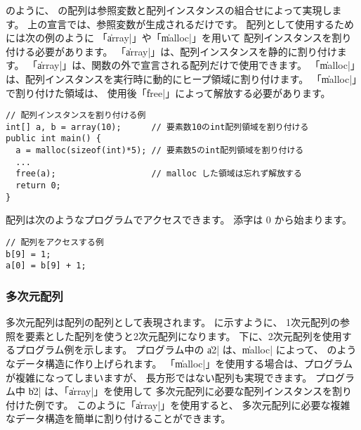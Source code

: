 のように、
\cmml の配列は参照変数と配列インスタンスの組合せによって実現します。
上の宣言では、参照変数が生成されるだけです。
配列として使用するためには次の例のように
「\|array|」や「\|malloc|」を用いて
配列インスタンスを割り付ける必要があります。
「\|array|」は、配列インスタンスを静的に割り付けます。
「\|array|」は、関数の外で宣言される配列だけで使用できます。
「\|malloc|」は、配列インスタンスを実行時に動的にヒープ領域に割り付けます。
「\|malloc|」で割り付けた領域は、
使用後「\|free|」によって解放する必要があります。

\begin{mylist}
\begin{verbatim}
// 配列インスタンスを割り付ける例
int[] a, b = array(10);      // 要素数10のint配列領域を割り付ける
public int main() {
  a = malloc(sizeof(int)*5); // 要素数5のint配列領域を割り付ける
  ...
  free(a);                   // malloc した領域は忘れず解放する
  return 0;
}
\end{verbatim}
\end{mylist}

配列は次のようなプログラムでアクセスできます。
添字は 0 から始まります。

\begin{mylist}
\begin{verbatim}
// 配列をアクセスする例
b[9] = 1;
a[0] = b[9] + 1;
\end{verbatim}
\end{mylist}

\subsubsection{多次元配列}

多次元配列は配列の配列として表現されます。
に示すように、
1次元配列の参照を要素とした配列を使うと2次元配列になります。
下に、2次元配列を使用するプログラム例を示します。
プログラム中の \|a2| は、\|malloc| によって、
のようなデータ構造に作り上げられます。
「\|malloc|」を使用する場合は、プログラムが複雑になってしまいますが、
長方形ではない配列も実現できます。
プログラム中 \|b2| は、「\|array|」を使用して
多次元配列に必要な配列インスタンスを割り付けた例です。
このように「\|array|」を使用すると、
多次元配列に必要な複雑なデータ構造を簡単に割り付けることができます。


